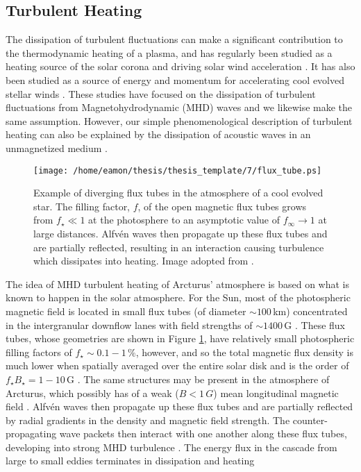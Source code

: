 \subsection{Turbulent Heating}\label{sec:7.4.3}
The dissipation of turbulent fluctuations can make a significant contribution to the thermodynamic heating of a plasma, and has regularly been studied as a heating source of the solar corona and driving solar wind acceleration \citep[e.g.,][]{lehe_2009, cranmer_2007}. It has also been studied as a source of energy and momentum for accelerating cool evolved stellar winds \citep[e.g.,][]{falceta_2006, hartmann_1980}. These studies have focused on the dissipation of turbulent fluctuations from Magnetohydrodynamic (MHD) waves and we likewise make the same assumption. However, our simple phenomenological description of turbulent heating can also be explained by the dissipation of acoustic waves in an unmagnetized medium \citep[e.g.,][]{lighthill_1952,stein_1967}.

\begin{figure}[!ht]
\centering 
         \texttt{[image: /home/eamon/thesis/thesis\_template/7/flux\_tube.ps]}
\caption[Example of diverging flux tubes]{Example of diverging flux tubes in the atmosphere of a cool evolved star. The filling factor, $f$, of the open magnetic flux tubes grows from $f_{\star} \ll 1$ at the photosphere to an asymptotic value of $f_{\infty} \rightarrow 1$ at large distances. Alfv\'en waves then propagate up these flux tubes and are partially reflected, resulting in an interaction causing turbulence which dissipates into heating. Image adopted from \cite{cranmer_2011}.}
\label{fig:7.4}
\end{figure}

The idea of MHD turbulent heating of Arcturus' atmosphere is based on what is known to happen in the solar atmosphere. For the Sun, most of the photospheric magnetic field is located in small flux tubes (of diameter $\sim 100$\,km) concentrated in the intergranular downflow lanes with field strengths of $\sim 1400$\,G \citep{berger_2001}. These flux tubes, whose geometries are shown in Figure \ref{fig:7.4}, have relatively small photospheric filling factors of $f_{\star} \sim 0.1-1\, \%$, however, and so the total magnetic flux density is much lower when spatially averaged over the entire solar disk and is the order of $f_{\star}B_{\star}=1-10$\,G \citep{schrijver_1989}. The same structures may be present in the atmosphere of Arcturus, which possibly has of a weak ($B < 1\,G$) mean longitudinal magnetic field \citep{Sennhauser_2011}. Alfv\'en waves then propagate up these flux tubes and are partially reflected by radial gradients in the density and magnetic field strength. The counter-propagating wave packets then interact with one another along these flux tubes, developing into strong MHD turbulence \citep{iroshnikov_1964}. The energy flux in the cascade from large to small eddies terminates in dissipation and heating \citep[e.g.,][]{matthaeus_1999, cranmer_2005} 


